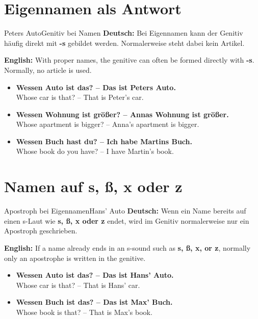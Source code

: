 \documentclass[a4paper,11pt]{article}
\newcommand{\GermanText}[1]{\textbf{Deutsch: }#1\par}
\newcommand{\EnglishText}[1]{{\small\color{SoftGray}\textbf{English: }#1\par}}
\newcommand{\ExampleItem}[2]{\item \textbf{#1}\\{\small\color{SoftGray}#2}}
\begin{document}
    
    \section{Eigennamen als Antwort}
        
        \begin{grammarentry}{Peters Auto}{Genitiv bei Namen}
            \GermanText{Bei Eigennamen kann der Genitiv häufig direkt mit \textbf{-s} gebildet werden. Normalerweise steht dabei kein Artikel.}
            \EnglishText{With proper names, the genitive can often be formed directly with \textbf{-s}. Normally, no article is used.}
        \end{grammarentry}
        
        \begin{exbox}
            \begin{itemize}
                \ExampleItem{Wessen Auto ist das? -- Das ist Peters Auto.}{Whose car is that? -- That is Peter's car.}
                
                \ExampleItem{Wessen Wohnung ist größer? -- Annas Wohnung ist größer.}{Whose apartment is bigger? -- Anna's apartment is bigger.}
                
                \ExampleItem{Wessen Buch hast du? -- Ich habe Martins Buch.}{Whose book do you have? -- I have Martin's book.}
            \end{itemize}
        \end{exbox}
    
    
    \section{Namen auf s, ß, x oder z}
        
        \begin{grammarentry}{Apostroph bei Eigennamen}{Hans' Auto}
            \GermanText{Wenn ein Name bereits auf einen s-Laut wie \textbf{s, ß, x oder z} endet, wird im Genitiv normalerweise nur ein Apostroph geschrieben.}
            \EnglishText{If a name already ends in an s-sound such as \textbf{s, ß, x, or z}, normally only an apostrophe is written in the genitive.}
        \end{grammarentry}
        
        \begin{exbox}
            \begin{itemize}
                \ExampleItem{Wessen Auto ist das? -- Das ist Hans' Auto.}{Whose car is that? -- That is Hans' car.}
                
                \ExampleItem{Wessen Buch ist das? -- Das ist Max' Buch.}{Whose book is that? -- That is Max's book.}
            \end{itemize}
        \end{exbox}
    
\end{document}
